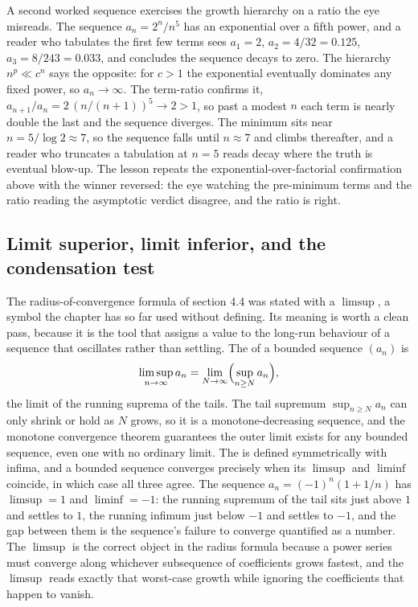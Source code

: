 A second worked sequence exercises the growth hierarchy on a ratio the
eye misreads. The sequence $a_{n} = 2^{n}/n^{5}$ has an exponential over
a fifth power, and a reader who tabulates the first few terms sees
$a_{1} = 2$, $a_{2} = 4/32 = 0.125$, $a_{3} = 8/243 = 0.033$, and
concludes the sequence decays to zero. The hierarchy $n^{p} \ll c^{n}$
says the opposite: for $c > 1$ the exponential eventually dominates any
fixed power, so $a_{n} \to \infty$. The term-ratio confirms it,
$a_{n+1}/a_{n} = 2\,(n/(n+1))^{5} \to 2 > 1$, so past a modest $n$ each
term is nearly double the last and the sequence diverges. The minimum
sits near $n = 5/\log 2 \approx 7$, so the sequence falls until $n
\approx 7$ and climbs thereafter, and a reader who truncates a
tabulation at $n = 5$ reads decay where the truth is eventual blow-up.
The lesson repeats the exponential-over-factorial confirmation above
with the winner reversed: the eye watching the pre-minimum terms and the
ratio reading the asymptotic verdict disagree, and the ratio is right.

\subsection{Limit superior, limit inferior, and the condensation test}

The radius-of-convergence formula of section 4.4 was stated with a
$\limsup$, a symbol the chapter has so far used without defining.
Its meaning is worth a clean pass, because it is the tool that assigns a
value to the long-run behaviour of a sequence that oscillates rather than
settling. The  of a bounded sequence $(a_{n})$ is
\[
\limsup_{n \to \infty} a_{n} = \lim_{N \to \infty}\Bigl(\sup_{n \geq N}
a_{n}\Bigr),
\]
the limit of the running suprema of the tails. The tail supremum
$\sup_{n \geq N} a_{n}$ can only shrink or hold as $N$ grows, so it is a
monotone-decreasing sequence, and the monotone convergence theorem
guarantees the outer limit exists for any bounded sequence, even one with
no ordinary limit. The  is defined symmetrically
with infima, and a bounded sequence converges precisely when its
$\limsup$ and $\liminf$ coincide, in which case all three agree. The
sequence $a_{n} = (-1)^{n}(1 + 1/n)$ has $\limsup = 1$ and $\liminf =
-1$: the running supremum of the tail sits just above $1$ and settles to
$1$, the running infimum just below $-1$ and settles to $-1$, and the gap
between them is the sequence's failure to converge quantified as a
number. The $\limsup$ is the correct object in the radius formula because
a power series must converge along whichever subsequence of coefficients
grows fastest, and the $\limsup$ reads exactly that worst-case growth
while ignoring the coefficients that happen to vanish.

